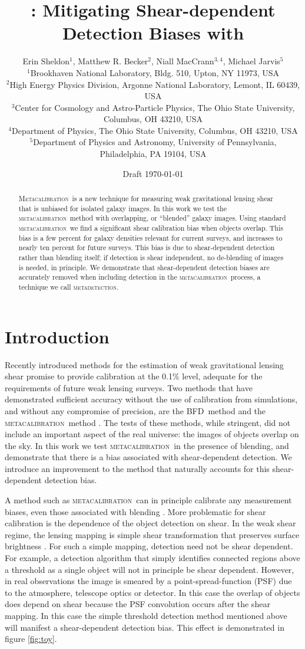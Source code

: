 \documentclass[fleqn,useAMS,usenatbib]{mnras}
\title[\Mdet]{\Mdet: Mitigating Shear-dependent Detection Biases with \Mcal}
\author[Sheldon et~al.]{Erin Sheldon$^1$, Matthew R. Becker$^2$,
Niall MacCrann$^{3,4}$, Michael Jarvis$^5$
  \\$^1$Brookhaven National Laboratory, Bldg. 510, Upton, NY 11973, USA
  \\$^2$High Energy Physics Division, Argonne National Laboratory, Lemont, IL 60439, USA
  \\$^3$Center for Cosmology and Astro-Particle Physics, The Ohio State University, Columbus, OH 43210, USA
  \\$^4$Department of Physics, The Ohio State University, Columbus, OH 43210, USA
  \\$^5$Department of Physics and Astronomy, University of Pennsylvania, Philadelphia, PA 19104, USA
}
\newcommand{\mcal}{\textsc{metacalibration}}
\newcommand{\mdet}{\textsc{metadetection}}
\newcommand{\Mcal}{\textsc{Metacalibration}}
\newcommand{\bfd}{\textsc{BFD}}
\begin{document}
\date{Draft \today}
\maketitle

\begin{abstract}

\Mcal\ is a new technique for measuring weak gravitational lensing shear that
is unbiased for isolated galaxy images.  In this work we test the \mcal\ method
with overlapping, or ``blended'' galaxy images.  Using standard \mcal\ we find
a significant shear calibration bias when objects overlap. This bias is a few
percent for galaxy densities relevant for current surveys, and increases to
nearly ten percent for future surveys.  This bias is due to shear-dependent
detection rather than blending itself; if detection is shear independent, no
de-blending of images is needed, in principle.  We demonstrate that
shear-dependent detection biases are accurately removed when including
detection in the \mcal\ process, a technique we call \mdet.

\end{abstract}

\section{Introduction}


Recently introduced methods for the estimation of weak gravitational lensing
shear promise to provide calibration at the 0.1\% level, adequate for the
requirements of future weak lensing surveys.  Two methods that have
demonstrated sufficient accuracy without the use of calibration from
simulations, and without any compromise of precision, are the \bfd\ method
\citep{BernBFD2016} and the \mcal\ method \citep{HuffMcal2017,SheldonMcal2017}.
The tests of these methods, while stringent, did not include an important
aspect of the real universe: the images of objects overlap on the sky. In this
work we test \mcal\ in the presence of blending, and demonstrate that there is
a bias associated with shear-dependent detection. We introduce an improvement
to the method that naturally accounts for this shear-dependent detection bias.

A method such as \mcal\ can in principle calibrate any measurement biases, even
those associated with blending \citep[e.g.,][]{DawsonBlending2016}. More problematic for
shear calibration is the dependence of the object detection on shear. In the
weak shear regime, the lensing mapping is simple shear transformation that
preserves surface brightness \citep{SchneiderBook92}. For such a simple mapping, detection need not
be shear dependent. For example, a detection algorithm that simply identifies
connected regions above a threshold as a single object will not in principle be
shear dependent. However, in real observations the image is smeared by a
point-spread-function (PSF) due to the atmosphere, telescope optics or detector.
In this case the overlap of objects does depend on shear because the PSF
convolution occurs after the shear mapping. In this case the simple threshold
detection method mentioned above will manifest a shear-dependent detection bias.
This effect is demonstrated in figure \ref{fig:toy}.
\end{document}

